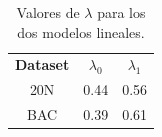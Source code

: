 \begin{table}[]
    \centering
    \begin{tabular}{|c|c|c|}
        \textbf{Dataset} & \textbf{$\lambda_0$} & \textbf{$\lambda_1$} \\
        20N & 0.44 & 0.56 \\
        BAC & 0.39 & 0.61 \\
    \end{tabular}
    \caption{Valores de $\lambda$ para los dos modelos lineales.}
    \label{tab:lambdas_linear}
\end{table}


